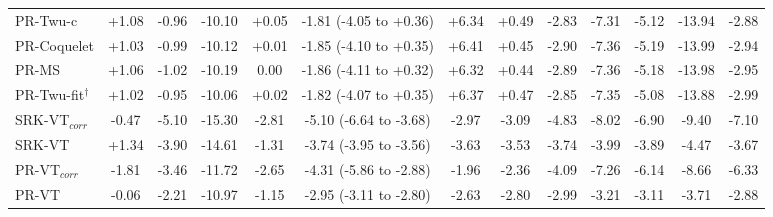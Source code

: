 \begin{table}[H]
\begin{tabular}{lcccccccccccc}
PR-Twu-c & +1.08 & -0.96 & -10.10 & +0.05 & -1.81 (-4.05 to +0.36) & +6.34 & +0.49 & -2.83 & -7.31 & -5.12 & -13.94 & -2.88 \\
PR-Coquelet & +1.03 & -0.99 & -10.12 & +0.01 & -1.85 (-4.10 to +0.35) & +6.41 & +0.45 & -2.90 & -7.36 & -5.19 & -13.99 & -2.94 \\
PR-MS & +1.06 & -1.02 & -10.19 & 0.00 & -1.86 (-4.11 to +0.32) & +6.32 & +0.44 & -2.89 & -7.36 & -5.18 & -13.98 & -2.95 \\
PR-Twu-fit$^{\dagger}$ & +1.02 & -0.95 & -10.06 & +0.02 & -1.82 (-4.07 to +0.35) & +6.37 & +0.47 & -2.85 & -7.35 & -5.08 & -13.88 & -2.99 \\
\midrule
SRK-VT$_{corr}$ & -0.47 & -5.10 & -15.30 & -2.81 & -5.10 (-6.64 to -3.68) & -2.97 & -3.09 & -4.83 & -8.02 & -6.90 & -9.40 & -7.10 \\
SRK-VT & +1.34 & -3.90 & -14.61 & -1.31 & -3.74 (-3.95 to -3.56) & -3.63 & -3.53 & -3.74 & -3.99 & -3.89 & -4.47 & -3.67 \\
PR-VT$_{corr}$ & -1.81 & -3.46 & -11.72 & -2.65 & -4.31 (-5.86 to -2.88) & -1.96 & -2.36 & -4.09 & -7.26 & -6.14 & -8.66 & -6.33 \\
PR-VT & -0.06 & -2.21 & -10.97 & -1.15 & -2.95 (-3.11 to -2.80) & -2.63 & -2.80 & -2.99 & -3.21 & -3.11 & -3.71 & -2.88 \\
\bottomrule
\end{tabular}
\end{table}
